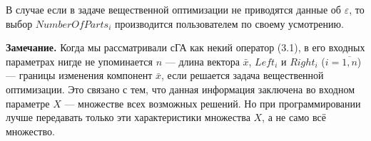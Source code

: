 В случае если в задаче вещественной оптимизации не приводятся данные об $ \varepsilon $, то выбор $ NumberOfParts_i $ производится пользователем по своему усмотрению.

\textbf{Замечание.} Когда мы рассматривали сГА как некий оператор (3.1), в его входных параметрах нигде не упоминается $ n $ --- длина вектора $ \bar{x} $, $ Left_i $ и $ Right_i $ ($ i=\overline{1,n} $) --- границы изменения компонент $ \bar{x} $, если решается задача вещественной оптимизации. Это связано с тем, что данная информация заключена во входном параметре $ X $ --- множестве всех возможных решений. Но при программировании лучше передавать только эти характеристики множества $ X $, а не само всё множество.

\clearpage